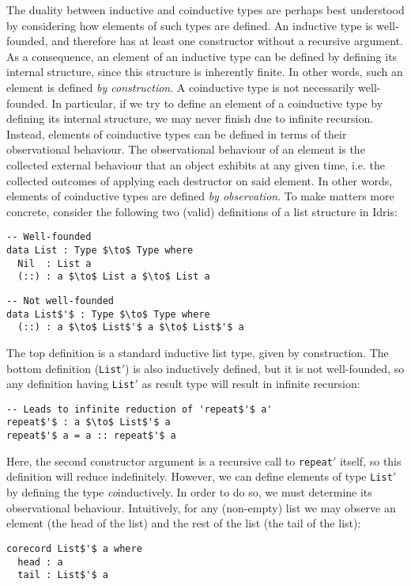 The duality between inductive and coinductive types are perhaps best understood
by considering how elements of such types are defined. An inductive type is
well-founded, and therefore has at least one constructor without a recursive
argument. As a consequence, an element of an inductive type can be defined by
defining its internal structure, since this structure is inherently finite. In
other words, such an element is defined \emph{by construction}. A coinductive type is not
necessarily well-founded. In particular, if we try to define an element of a
coinductive type by defining its internal structure, we may never finish due to
infinite recursion. Instead, elements of coinductive types can be defined in
terms of their observational behaviour. The observational behaviour of an
element is the collected external behaviour that an object exhibits at any given
time, i.e. the collected outcomes of applying each destructor on said
element. In other words, elements of coinductive types are defined \emph{by
  observation}. To make matters more concrete, consider the following two (valid)
definitions of a list structure in Idris:
\begin{lstlisting}[mathescape,title=\idrisBlock]
-- Well-founded
data List : Type $\to$ Type where
  Nil  : List a
  (::) : a $\to$ List a $\to$ List a
\end{lstlisting}
\begin{lstlisting}[mathescape,title=\idrisBlock]
-- Not well-founded
data List$'$ : Type $\to$ Type where
  (::) : a $\to$ List$'$ a $\to$ List$'$ a
\end{lstlisting}
The top definition is a standard inductive list type, given by construction. The
bottom definition (\texttt{List$'$}) is also inductively defined, but it is not well-founded, so any definition
having \texttt{List$'$} as result type will result in infinite
recursion:
\begin{lstlisting}[mathescape,title=\idrisBlock]
-- Leads to infinite reduction of 'repeat$'$ a'
repeat$'$ : a $\to$ List$'$ a
repeat$'$ a = a :: repeat$'$ a
\end{lstlisting}
Here, the second constructor argument is a recursive call to
\texttt{repeat$'$} itself, so this definition will reduce indefinitely.
However, we can define elements of type \texttt{List$'$} by defining the type
\emph{co}inductively. In order to do so, we must determine its observational
behaviour. Intuitively, for any (non-empty) list we may observe an element (the head of the
list) and the rest of the list (the tail of the list):
\begin{lstlisting}[mathescape,title=\idrisBlock]
corecord List$'$ a where
  head : a
  tail : List$'$ a
\end{lstlisting}
